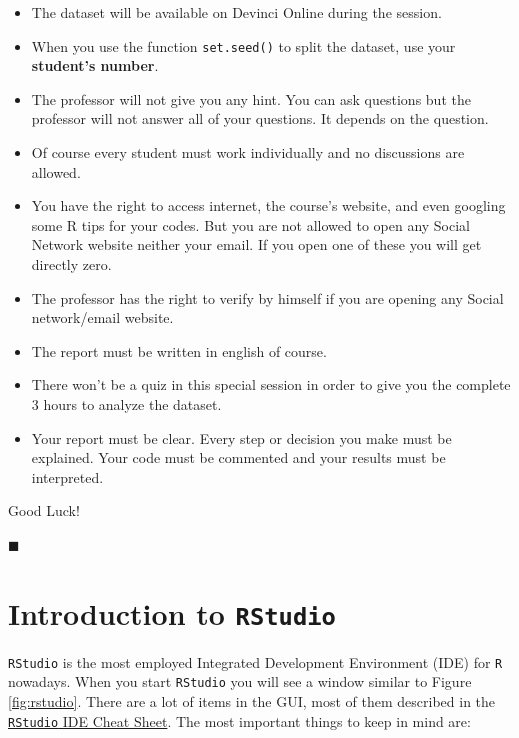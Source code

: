 \documentclass[]{book}
\providecommand{\tightlist}{%
  \setlength{\itemsep}{0pt}\setlength{\parskip}{0pt}}
\theoremstyle{definition}
\theoremstyle{definition}
\theoremstyle{definition}
\theoremstyle{remark}
\begin{document}
\begin{itemize}
\item
  The dataset will be available on Devinci Online during the session.
\item
  When you use the function \texttt{set.seed()} to split the dataset,
  use your \textbf{student's number}.
\item
  The professor will not give you any hint. You can ask questions but
  the professor will not answer all of your questions. It depends on the
  question.
\item
  Of course every student must work individually and no discussions are
  allowed.
\item
  You have the right to access internet, the course's website, and even
  googling some R tips for your codes. But you are not allowed to open
  any Social Network website neither your email. If you open one of
  these you will get directly zero.
\item
  The professor has the right to verify by himself if you are opening
  any Social network/email website.
\item
  The report must be written in english of course.
\item
  There won't be a quiz in this special session in order to give you the
  complete 3 hours to analyze the dataset.
\end{itemize}

\begin{itemize}
\tightlist
\item
  Your report must be clear. Every step or decision you make must be
  explained. Your code must be commented and your results must be
  interpreted.
\end{itemize}

Good Luck!

◼

\appendix {}


\chapter{\texorpdfstring{Introduction to
\texttt{RStudio}}{Introduction to RStudio}}\label{app-introRStudio}

\texttt{RStudio} is the most employed Integrated Development Environment
(IDE) for \texttt{R} nowadays. When you start \texttt{RStudio} you will
see a window similar to Figure \ref{fig:rstudio}. There are a lot of
items in the GUI, most of them described in the
\href{https://www.rstudio.com/wp-content/uploads/2016/01/rstudio-IDE-cheatsheet.pdf}{\texttt{RStudio}
IDE Cheat Sheet}. The most important things to keep in mind are:
\end{document}
